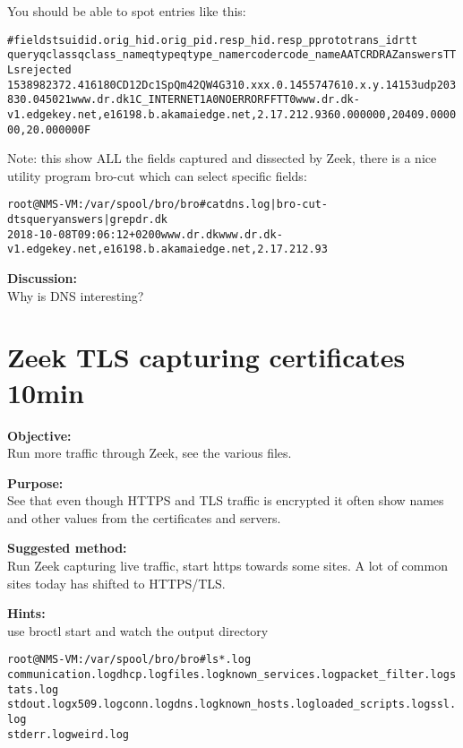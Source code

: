 \documentclass[a4paper,11pt,notitlepage]{report}
\begin{document}
You should be able to spot entries like this:
\begin{alltt}\small
#fields ts      uid     id.orig_h       id.orig_p       id.resp_h       id.resp_p       proto   trans_id        rtt
     query   qclass  qclass_name     qtype   qtype_name      rcode   rcode_name      AA      TC      RD      RA      Z       answers TTLs    rejected
1538982372.416180	CD12Dc1SpQm42QW4G3	10.xxx.0.145	57476	10.x.y.141	53	udp	20383	0.045021	www.dr.dk	1	C_INTERNET	1	A	0	NOERROR	F	F	T	T	0	www.dr.dk-v1.edgekey.net,e16198.b.akamaiedge.net,2.17.212.93	60.000000,20409.000000,20.000000	F
\end{alltt}

Note: this show ALL the fields captured and dissected by Zeek, there is a nice utility program bro-cut which can select specific fields:

\begin{alltt}\small
root@NMS-VM:/var/spool/bro/bro# cat dns.log | bro-cut -d ts query answers | grep dr.dk
2018-10-08T09:06:12+0200	www.dr.dk	www.dr.dk-v1.edgekey.net,e16198.b.akamaiedge.net,2.17.212.93
\end{alltt}

{\bf Discussion:}\\
Why is DNS interesting?


\chapter{Zeek TLS capturing certificates 10min}
\label{ex:zeektlsbasic}


{\bf Objective:} \\
Run more traffic through Zeek, see the various files.


{\bf Purpose:}\\
See that even though HTTPS and TLS traffic is encrypted it often show names and other values from the certificates and servers.


{\bf Suggested method:}\\
Run Zeek capturing live traffic, start https towards some sites. A lot of common sites today has shifted to HTTPS/TLS.


{\bf Hints:}\\
use broctl start and watch the output directory

\begin{alltt}\small
root@NMS-VM:/var/spool/bro/bro# ls *.log
communication.log  dhcp.log files.log known_services.log packet_filter.log  stats.log
stdout.log x509.log conn.log dns.log known_hosts.log loaded_scripts.log  ssl.log
stderr.log weird.log
\end{alltt}
\end{document}
